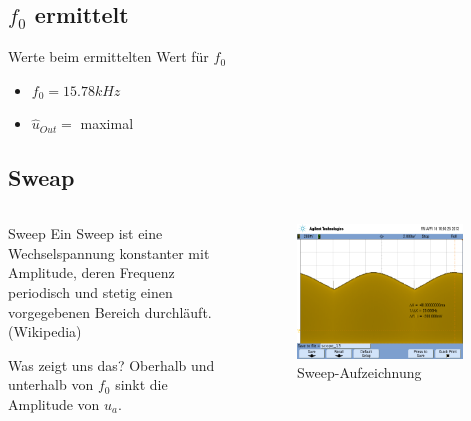 \subsection{$f_0$ ermittelt}
\begin{frame}
	\begin{block}{Werte beim ermittelten Wert für $f_0$}
		\begin{itemize}
			\item $f_0 = 15.78kHz$
			\item $\hat u_{Out} =$ maximal
		\end{itemize}
	\end{block}
\end{frame}

\subsection{Sweap}
\begin{frame}
	\begin{columns}
		\begin{column}{5cm}
			\begin{block}{Sweep}
				Ein Sweep ist eine Wechselspannung 
				konstanter mit Amplitude, deren Frequenz 
				periodisch und stetig einen vorgegebenen 
				Bereich durchläuft. (Wikipedia)
			\end{block}
			\begin{exampleblock}{Was zeigt uns das?}
				Oberhalb und unterhalb von $f_0$ sinkt die
				Amplitude von $u_a$.
			\end{exampleblock}
		\end{column}
		\begin{column}{5cm}
			\begin{figure}
				\includegraphics[width=0.95\textwidth]{scope_13.png}
				\caption{Sweep-Aufzeichnung}
			\end{figure}
		\end{column}
	\end{columns}
\end{frame}
